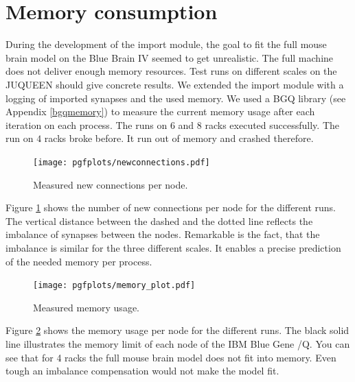 \section{Memory consumption}
During the development of the import module, the goal to fit the full mouse brain model on the
Blue Brain IV seemed to get unrealistic. The full machine does not deliver enough memory resources.
Test runs on different scales on the JUQUEEN should give concrete results.
We extended the import module with a logging of imported synapses and the used memory.
We used a BGQ library (see Appendix \ref{bgqmemory}) to measure the current memory usage after each iteration on each process. The runs on $6$ and $8$ racks executed successfully.
The run on $4$ racks broke before. It run out of memory and crashed therefore.
\begin{figure}[h!]
\begin{center}
 \texttt{[image: pgfplots/newconnections.pdf]}
\end{center}
\caption{Measured new connections per node.
 }
\label{fig:newconnections}
\end{figure}
Figure \ref{fig:newconnections} shows the number of new connections per node for the different runs.
The vertical distance between the dashed and the dotted line reflects the imbalance of synapses between the nodes. Remarkable is the fact, that the imbalance is similar for the three different scales.
It enables a precise prediction of the needed memory per process.
\begin{figure}[h!]
\begin{center}
 \texttt{[image: pgfplots/memory\_plot.pdf]}
\end{center}
\caption{Measured memory usage.
 }
\label{fig:memoryplot}
\end{figure}
Figure \ref{fig:memoryplot} shows the memory usage per node for the different runs.
The black solid line illustrates the memory limit of each node of the IBM Blue Gene /Q.
You can see that for 4 racks the full mouse brain model does not fit into memory.
Even tough an imbalance compensation would not make the model fit. 





